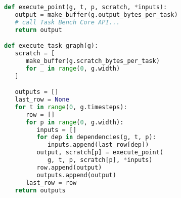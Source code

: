 \begin{lstlisting}[language=Python,caption={Excerpt from Dask implementation.\label{lst:code-sample}},float]
def execute_point(g, t, p, scratch, *inputs):
   output = make_buffer(g.output_bytes_per_task)
   # call Task Bench Core API...
   return output

def execute_task_graph(g):
   scratch = [
      make_buffer(g.scratch_bytes_per_task)
      for _ in range(0, g.width)
   ]

   outputs = []
   last_row = None
   for t in range(0, g.timesteps):
      row = []
      for p in range(0, g.width):
         inputs = []
         for dep in dependencies(g, t, p):
            inputs.append(last_row[dep])
         output, scratch[p] = execute_point(
            g, t, p, scratch[p], *inputs)
         row.append(output)
         outputs.append(output)
      last_row = row
   return outputs
\end{lstlisting}
